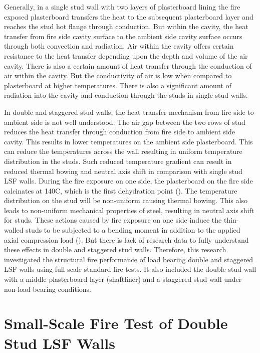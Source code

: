 Generally, in a single stud wall with two layers of plasterboard lining the fire exposed plasterboard transfers the heat to the subsequent plasterboard layer and reaches the stud hot flange through conduction. But within the cavity, the heat transfer from fire side cavity surface to the ambient side cavity surface occurs through both convection and radiation. Air within the cavity offers certain resistance to the heat transfer depending upon the depth and volume of the air cavity. There is also a certain amount of heat transfer through the conduction of air within the cavity. But the conductivity of air is low when compared to plasterboard at higher temperatures. There is also a significant amount of radiation into the cavity and conduction through the studs in single stud walls. 

In double and staggered stud walls, the heat transfer mechanism from fire side to ambient side is not well understood. The air gap between the two rows of stud reduces the heat transfer through conduction from fire side to ambient side cavity. This results in lower temperatures on the ambient side plasterboard. This can reduce the temperatures across the wall resulting in uniform temperature distribution in the studs. Such reduced temperature gradient can result in reduced thermal bowing and neutral axis shift in comparison with single stud LSF walls. During the fire exposure on one side, the plasterboard on the fire side calcinates at 140\degree C, which is the first dehydration point (\cite{Keerthan2012a}). The temperature distribution on the stud will be non-uniform causing thermal bowing. This also leads to non-uniform mechanical properties of steel, resulting in neutral axis shift for studs. These actions caused by fire exposure on one side induce the thin-walled studs to be subjected to a bending moment in addition to the applied axial compression load (\cite{Gunalan2013e}). But there is lack of research data to fully understand these effects in double and staggered stud walls. Therefore, this research investigated the structural fire performance of load bearing double and staggered LSF walls using full scale standard fire tests. It also included the double stud wall with a middle plasterboard layer (shaftliner) and a staggered stud wall under non-load bearing conditions.

\section{Small-Scale Fire Test of Double Stud LSF Walls}

